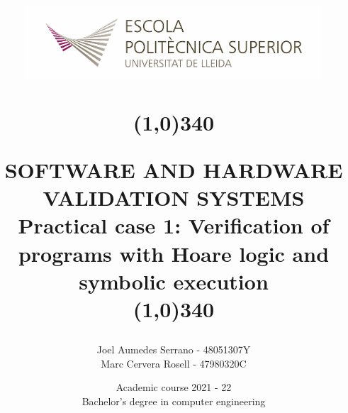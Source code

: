 \title{
	\begin{center}
	\vspace{3cm}
	\includegraphics[width=11cm, height=3cm]{images/Logo-nou-eps.jpg}
	\end{center}
	\begin{center}
	\line(1,0){340}
	\end{center}		
	SOFTWARE AND HARDWARE VALIDATION SYSTEMS\\
	\vspace{2mm}
	\Large Practical case 1: Verification of programs with Hoare logic and symbolic execution\\
	\line(1,0){340}
	\vspace{1.5cm}
	}

\author{Joel Aumedes Serrano - 48051307Y \\ Marc Cervera Rosell - 47980320C \vspace{1cm}}


\date{Academic course 2021 - 22\vspace{0.5cm} \\Bachelor's degree in computer engineering}
